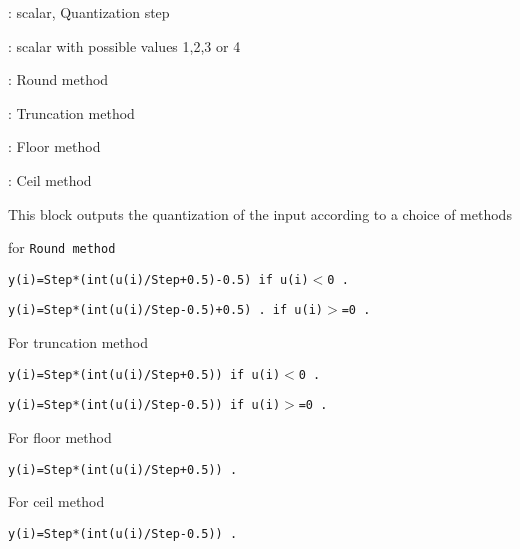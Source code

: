%
%


\label{QUANTf}

\begin{scitem}
\item[{\verb?Step?}]
: scalar, Quantization step
\item[{\verb?Quantization method?}]
: scalar with possible values 1,2,3 or 4
\begin{scitem}
\item[{\verb?1?}]
: Round method
\item[{\verb?2?}]
: Truncation method
\item[{\verb?3?}]
:
Floor method
\item[{\verb?4?}]
:
Ceil method
\end{scitem}
\end{scitem}%
This block outputs the quantization of the input according to a choice
of methods
\par\noindent
for %
\tt Round %
\rm method 

%
\tt y(i)=Step*(int(u(i)/Step+0.5)-0.5) %
\rm if %
\tt u(i)$<$0%
\rm .

%
\tt y(i)=Step*(int(u(i)/Step-0.5)+0.5)%
\rm . if %
\tt u(i)$>$=0%
\rm .

\par\noindent
For truncation method

%
\tt y(i)=Step*(int(u(i)/Step+0.5)) %
\rm if %
\tt u(i)$<$0%
\rm .

%
\tt y(i)=Step*(int(u(i)/Step-0.5)) %
\rm if %
\tt u(i)$>$=0%
\rm .

\par\noindent
For floor method

%
\tt y(i)=Step*(int(u(i)/Step+0.5)) %
\rm .

\par\noindent
For ceil method

%
\tt y(i)=Step*(int(u(i)/Step-0.5)) %
\rm .



%
%


\label{RANDf}

